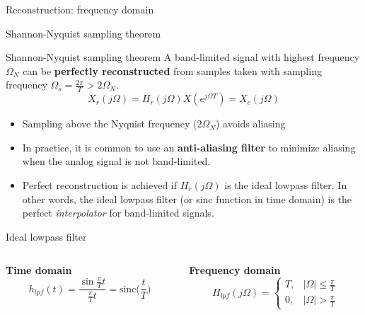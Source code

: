 \documentclass[10pt, aspectratio=169]{beamer}
\begin{document}
\begin{frame}{Reconstruction: frequency domain}
\begin{center}
	\resizebox{0.75\linewidth}{!}{}
\end{center}
\end{frame}

\begin{frame}{Shannon-Nyquist sampling theorem}

\begin{block}{Shannon-Nyquist sampling theorem}
	A band-limited signal with highest frequency $\Omega_N$ can be \textbf{perfectly reconstructed} from samples taken with sampling frequency $\Omega_s = \frac{2\pi}{T} > 2\Omega_N$.
	\begin{equation*}
	X_r(j\Omega) = H_r(j\Omega)X(e^{j\Omega T}) = X_c(j\Omega)
	\end{equation*}
\end{block}

\begin{itemize}
	\item Sampling above the Nyquist frequency ($2\Omega_N$) avoids aliasing 
	\item In practice, it is common to use an \textbf{anti-aliasing filter} to minimize aliasing when the analog signal is not band-limited.
	\item Perfect reconstruction is achieved if $H_r(j\Omega)$ is the ideal lowpass filter. In other words, the ideal lowpass filter (or sinc function in time domain) is the perfect \textit{interpolator} for band-limited signals.
\end{itemize}
\end{frame}

\begin{frame}[t]{Ideal lowpass filter}

\begin{columns}[t]
	\begin{column}{0.5\linewidth}
		\textbf{Time domain}
		\vspace{0.2cm}
		\begin{equation*}
			h_{lpf}(t) = \frac{\sin\frac{\pi}{T}t}{\frac{\pi}{T}t} = \mathrm{sinc}\Big(\frac{t}{T}\Big)
		\end{equation*}
	\end{column}
	
	\begin{column}{0.5\linewidth}
		\textbf{Frequency domain}
		\begin{equation*}
			H_{lpf}(j\Omega) = \begin{cases}
			T, & |\Omega|\leq\frac{\pi}{T} \\
			0, & |\Omega| > \frac{\pi}{T}
			\end{cases}
		\end{equation*}	
	\end{column}
\end{columns}
\begin{center}
	\resizebox{0.9\linewidth}{!}{}
\end{center}
\end{frame}
\end{document}
